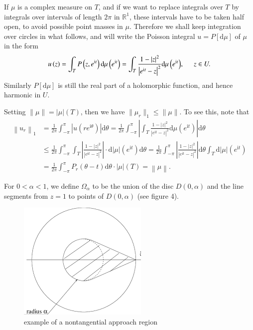 If $\mu$ is a complex measure on $T$, and if we want to replace integrals over $T$ by integrals over intervals of length $2\pi$ in $\mathbb{R}^1$, these intervals have to be taken half open, to avoid possible point masses in $\mu$. Therefore we shall keep integration over circles in what follows, and will write the Poisson integral $u=P[\mathrm{d}\mu]$ of $\mu$ in the form 
$$
u\left( z \right) =\int_T{P\left( z,e^{\mathrm{i}t} \right) \mathrm{d}\mu \left( e^{\mathrm{i}t} \right)}=\int_T{\frac{1-\left| z \right|^2}{\left| e^{\mathrm{i}t}-z \right|^2}\mathrm{d}\mu \left( e^{\mathrm{i}t} \right)},\hspace{0.5cm}z\in U.
$$
Similarly $P[\mathrm{d}\mu]$ is still the real part of a holomorphic function, and hence harmonic in $U$.\par
Setting $\|\mu\|=|\mu|(T)$, then we have $\|\mu_r\|_1\le\|\mu\|$. To see this, note that 
$$
\begin{aligned}
\left\| u_r \right\| _1&=\frac{1}{2\pi}\int_{-\pi}^{\pi}{\left| u\left( re^{\mathrm{i}\theta} \right) \right|\mathrm{d}\theta}=\frac{1}{2\pi}\int_{-\pi}^{\pi}{\left| \int_T{\frac{1-\left| z \right|^2}{\left| e^{\mathrm{i}t}-z \right|^2}\mathrm{d}\mu \left( e^{\mathrm{i}t} \right)} \right|\mathrm{d}\theta}
\\
&\le \frac{1}{2\pi}\int_{-\pi}^{\pi}{\int_T{\left| \frac{1-\left| z \right|^2}{\left| e^{\mathrm{i}t}-z \right|^2} \right|\cdot \mathrm{d}\left| \mu \right|\left( e^{\mathrm{i}t} \right)}\mathrm{d}\theta}=\frac{1}{2\pi}\int_{-\pi}^{\pi}{\left| \frac{1-\left| z \right|^2}{\left| e^{\mathrm{i}t}-z \right|^2} \right|\mathrm{d}\theta \int_T{\mathrm{d}\left| \mu \right|\left( e^{\mathrm{i}t} \right)}}
\\
&=\frac{1}{2\pi}\int_{-\pi}^{\pi}{P_r\left( \theta -t \right) \mathrm{d}\theta}\cdot \left| \mu \right|\left( T \right) =\left\| \mu \right\| .
\end{aligned}
$$\par
For $0<\alpha<1$, we define $\Omega_\alpha$ to be the union of the disc $D(0,\alpha)$ and the line segments from $z=1$ to points of $D(0,\alpha)$ (see figure 4).
\begin{center}
\begin{figure}[htbp]
    \center
    \includegraphics[scale=0.75]{img/nontangential approach region.png}
    \caption{example of a nontangential approach region}
\end{figure}
\end{center}
